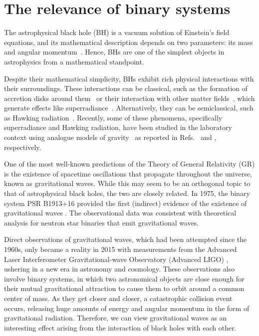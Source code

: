 \section{The relevance of binary systems}

The astrophysical black hole (BH) is a vacuum solution of Einstein's field equations, and its mathematical description depends on two parameters: its mass and angular momentum~\cite{1986bhmp.book.....T}. Hence, BHs are one of the simplest objects in astrophysics from a mathematical standpoint.

Despite their mathematical simplicity, BHs exhibit rich physical interactions with their surroundings. These interactions can be classical, such as the formation of accretion disks around them~\cite{Abramowicz2013} or their interaction with other matter fields~\cite{Ficarra2023}, which generate effects like superradiance~\cite{PhysRevD.87.043513}. Alternatively, they can be semiclassical, such as Hawking radiation~\cite{Wald2001}. Recently, some of these phenomena, specifically superradiance and Hawking radiation, have been studied in the laboratory context using analogue models of gravity~\cite{Barcel2011} as reported in Refs.~\cite{Torres2017} and \cite{Kolobov2021}, respectively.

One of the most well-known predictions of the Theory of General Relativity (GR) is the existence of spacetime oscillations that propagate throughout the universe, known as gravitational waves. While this may seem to be an orthogonal topic to that of astrophysical black holes, the two are closely related. In 1975, the binary system PSR B1913$+$16 provided the first (indirect) evidence of the existence of gravitational waves \cite{1975ApJ...195L..51H}. The observational data was consistent with theoretical analysis for neutron star binaries that emit gravitational waves.

Direct observations of gravitational waves, which had been attempted since the 1960s, only became a reality in 2015 with measurements from the Advanced Laser Interferometer Gravitational-wave Observatory (Advanced LIGO) \cite{grav1,grav2}, ushering in a new era in astronomy and cosmology. These observations also involve binary systems, in which two astronomical objects are close enough for their mutual gravitational attraction to cause them to orbit around a common center of mass. As they get closer and closer, a catastrophic collision event occurs, releasing huge amounts of energy and angular momentum in the form of gravitational radiation. Therefore, we can view gravitational waves as an interesting effect arising from the interaction of black holes with each other.

